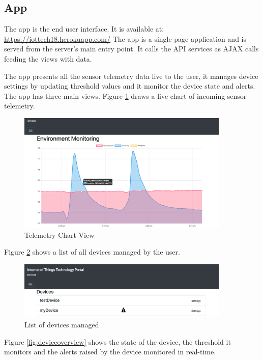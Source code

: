 \subsection{App}

The app is the end user interface. It is available at: \href{https://iottech18.herokuapp.com/}{https://iottech18.herokuapp.com/} The app is a single page application and is served from the server's main entry point. It calls the API services as AJAX calls feeding the views with data. 

The app presents all the sensor telemetry data live to the user, it manages device settings by updating threshold values and it monitor the device state and alerts. The app has three main views.
Figure \ref{fig:chartview} draws a live chart of incoming sensor telemetry. 

\begin{figure}[H]
    \centering
    \includegraphics[width=0.9\textwidth]{figures/App/app_dashboard}
    \caption{Telemetry Chart View}
    \label{fig:chartview}
\end{figure}

Figure \ref{fig:devicelist} shows a list of all devices managed by the user. 

\begin{figure}[H]
    \centering
    \includegraphics[width=0.9\textwidth]{figures/App/app_device_list}
    \caption{List of devices managed}
    \label{fig:devicelist}
\end{figure}

Figure \ref{fig:deviceoverview} shows the state of the device, the threshold it monitors and the alerts raised by the device monitored in real-time.

